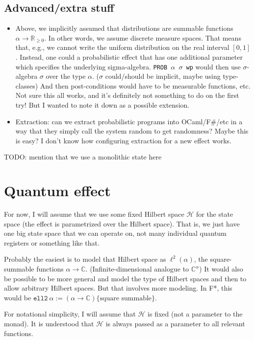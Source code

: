 \documentclass[a4paper]{article}
\newcommand\setR{\mathbb R}
\newcommand\Rpos{\setR_{\geq0}}
\newcommand\elltwo{\ell^2}
\newcommand\setC{\mathbb C}
\newcommand\calH{\mathcal H}
\begin{document}
\subsection{Advanced/extra stuff}

\begin{itemize}
\item Above, we implicitly assumed that distributions are summable
  functions $\alpha\to\Rpos$. In other words, we assume discrete
  measure spaces. That means that, e.g., we cannot write the uniform
  distribution on the real interval $[0,1]$. Instead, one could a
  probabilistic effect that has one additional parameter which
  specifies the underlying sigma-algebra. \texttt{PROB $\alpha$
    $\sigma$ wp} would then use $\sigma$-algebra $\sigma$ over the
  type $\alpha$. ($\sigma$ could/should be implicit, maybe using
  type-classes) And then post-conditions would have to be measurable
  functions, etc. Not sure this all works, and it's definitely not
  something to do on the first try! But I wanted to note it down as a
  possible extension.
\item Extraction: can we extract probabilistic programs into
  OCaml/F\#/etc in a way that they simply call the system random to
  get randomness? Maybe this is easy? I don't know how configuring
  extraction for a new effect works.
\end{itemize}

TODO: mention that we use a monolithic state here

\section{Quantum effect}

For now, I will assume that we use some fixed Hilbert space $\calH$
for the state space (the effect is parametrized over the Hilbert
space). That is, we just have one big state space that we can operate
on, not many individual quantum registers or something like that.

Probably the easiest is to model that Hilbert space as
$\elltwo(\alpha)$, the square-summable functions
$\alpha\to\setC$. (Infinite-dimensional analogue to $\setC^\alpha$) It
would also be possible to be more general and model the type of
Hilbert spaces and then to allow arbitrary Hilbert spaces. But that
involves more modeling. In F*, this would be
$\mathtt{ell2}\ \alpha := (\alpha\to\setC)\{\text{square
  summable}\}$.

For notational simplicity, I will assume that $\calH$ is fixed (not a
parameter to the monad). It is understood that $\calH$ is always
passed as a parameter to all relevant functions.
\end{document}
